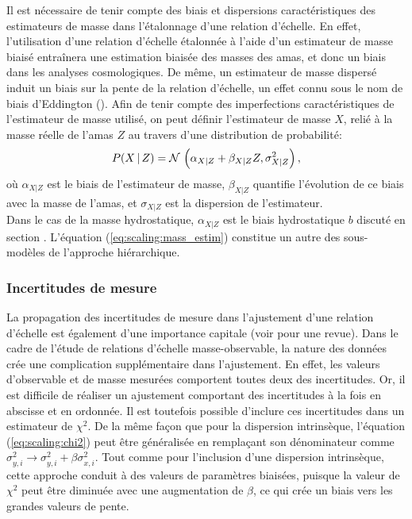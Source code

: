 Il est nécessaire de tenir compte des biais et dispersions caractéristiques des estimateurs de masse dans l'étalonnage d'une relation d'échelle.
En effet, l'utilisation d'une relation d'échelle étalonnée à l'aide d'un estimateur de masse biaisé entraînera une estimation biaisée des masses des amas, et donc un biais dans les analyses cosmologiques.
De même, un estimateur de masse dispersé induit un biais sur la pente de la relation d'échelle, un effet connu sous le nom de biais d'Eddington (\cite{eddington_formula_1913, eddington_correction_1940}).
Afin de tenir compte des imperfections caractéristiques de l'estimateur de masse utilisé, on peut définir l'estimateur de masse $X$, relié à la masse réelle de l'amas $Z$ au travers d'une distribution de probabilité:
\begin{equation}
    \label{eq:scaling:mass_estim}
    P(X\,|\,Z) = \mathcal{N}\, \left(\alpha_{X|Z} + \beta_{X|Z} Z, \sigma_{X|Z}^2\right),
\end{equation}
où $\alpha_{X|Z}$ est le biais de l'estimateur de masse, $\beta_{X|Z}$ quantifie l'évolution de ce biais avec la masse de l'amas, et $\sigma_{X|Z}$ est la dispersion de l'estimateur. \\
Dans le cas de la masse hydrostatique, $\alpha_{X|Z}$ est le biais hydrostatique $b$ discuté en section .
L'équation (\ref{eq:scaling:mass_estim}) constitue un autre des sous-modèles de l'approche hiérarchique. %

\subsubsection{Incertitudes de mesure} %

La propagation des incertitudes de mesure dans l'ajustement d'une relation d'échelle est également d'une importance capitale (voir \cite{andreon_measurement_2013} pour une revue).
Dans le cadre de l'étude de relations d'échelle masse-observable, la nature des données crée une complication supplémentaire dans l'ajustement.
En effet, les valeurs d'observable et de masse mesurées comportent toutes deux des incertitudes.
Or, il est difficile de réaliser un ajustement comportant des incertitudes à la fois en abscisse et en ordonnée.
Il est toutefois possible d'inclure ces incertitudes dans un estimateur de $\chi^2$.
De la même façon que pour la dispersion intrinsèque, l'équation (\ref{eq:scaling:chi2}) peut être généralisée en remplaçant son dénominateur comme $\sigma_{y,i}^2 \rightarrow \sigma_{y,i}^2 + \beta \sigma_{x, i}^2$.
Tout comme pour l'inclusion d'une dispersion intrinsèque, cette approche conduit à des valeurs de paramètres biaisées, puisque la valeur de $\chi^2$ peut être diminuée avec une augmentation de $\beta$, ce qui crée un biais vers les grandes valeurs de pente.

